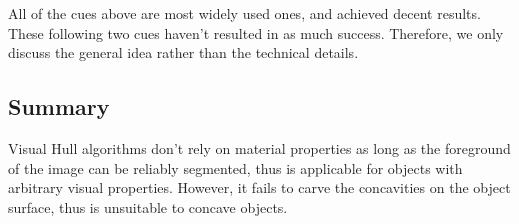 All of the cues above are most widely used ones, and achieved decent results. These following two cues haven't resulted in as much success. Therefore, we only discuss the general idea rather than the technical details.

\subsection{Summary}
Visual Hull algorithms don't rely on material properties as long as the foreground of the image can be reliably segmented, thus is applicable for objects with arbitrary visual properties. However, it fails to carve the concavities on the object surface, thus is unsuitable to concave objects.




